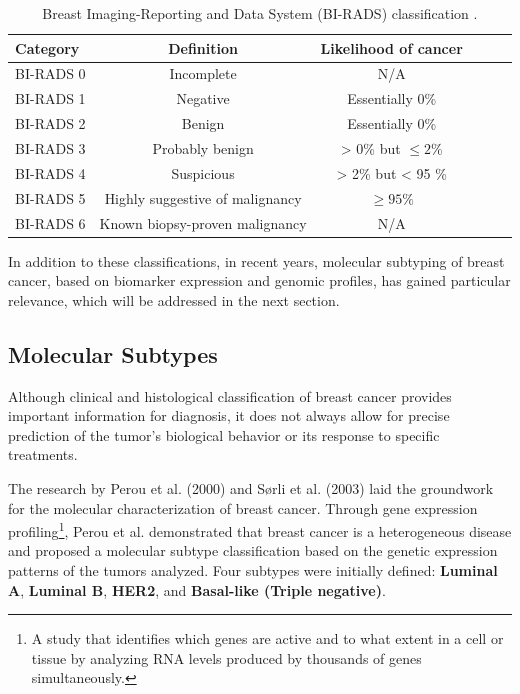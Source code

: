 \documentclass[a4paper,10pt]{book}
\begin{document}
\begin{table}[h!]
	\caption[Breast Imaging-Reporting and Data System (BI-RADS)]{Breast Imaging-Reporting and Data System (BI-RADS) classification \cite{noauthor_bi-rads_2025}.}
	\centering
	\begin{tabular}{lccccc}
		\toprule
		\textbf{Category} & \textbf{Definition} & \textbf{Likelihood of cancer}\\
		\midrule
		BI-RADS 0        & Incomplete                         & N/A \\
		BI-RADS 1        & Negative                           & Essentially 0\% \\
            BI-RADS 2        & Benign                             & Essentially 0\%  \\
            BI-RADS 3        & Probably benign                    & > 0\% but $\leq 2\%$ \\
            BI-RADS 4        & Suspicious                         & > 2\% but < 95 \% \\
            BI-RADS 5        & Highly suggestive of malignancy    & $\geq 95\%$ \\
            BI-RADS 6        & Known biopsy-proven malignancy     & N/A \\
		\bottomrule
	\end{tabular}
	\label{tab:birads_table}
\end{table}


In addition to these classifications, in recent years, molecular subtyping of breast cancer, based on biomarker expression and genomic profiles, has gained particular relevance, which will be addressed in the next section.


\subsection{Molecular Subtypes}

Although clinical and histological classification of breast cancer provides important information for diagnosis, it does not always allow for precise prediction of the tumor’s biological behavior or its response to specific treatments.

The research by Perou et al. (2000) \cite{perou_molecular_2000} and Sørli et al. (2003) \cite{sorlie_repeated_2003} laid the groundwork for the molecular characterization of breast cancer. Through gene expression profiling\footnote{A study that identifies which genes are active and to what extent in a cell or tissue by analyzing RNA levels produced by thousands of genes simultaneously.}, Perou et al. demonstrated that breast cancer is a heterogeneous disease and proposed a molecular subtype classification based on the genetic expression patterns of the tumors analyzed. Four subtypes were initially defined: \textbf{Luminal A}, \textbf{Luminal B}, \textbf{HER2}, and \textbf{Basal-like (Triple negative)}.
\end{document}

